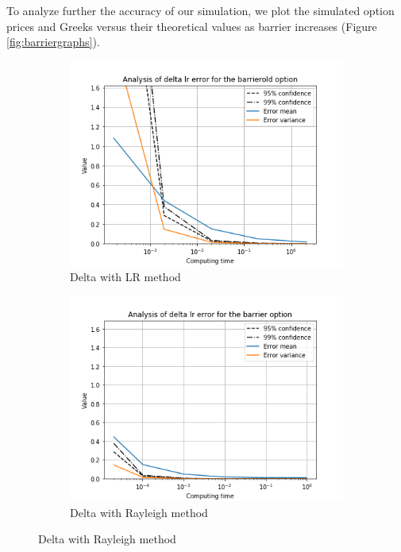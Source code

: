 \documentclass[11pt,a4paper,fleqn]{article}
\begin{document}
To analyze further the accuracy of our simulation, we plot the simulated option prices and Greeks versus their theoretical values as barrier increases (Figure \ref{fig:barriergraphs}).

\begin{figure}[h!]
  \centering
      \begin{subfigure}[b]{0.45\textwidth}
          \includegraphics[width=\textwidth]{graphs/barrierolddeltalrtime.png}
          \caption{Delta with LR method}
      \end{subfigure}
      \begin{subfigure}[b]{0.45\textwidth}
          \includegraphics[width=\textwidth]{graphs/barrierdeltalrtime.png}
          \caption{Delta with Rayleigh method}
      \end{subfigure}


\end{figure}
\end{document}
